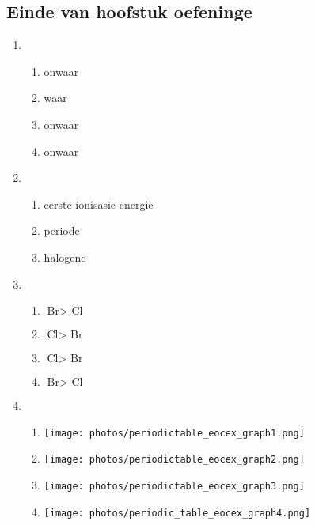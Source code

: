 \subsection{Einde van hoofstuk oefeninge} 
\begin{multicols}{3}
    \begin{enumerate}[itemsep=6pt, label=\textbf{\arabic*}. ] 
\item %
 \begin{enumerate}[noitemsep, label=\textbf{(\alph*)} ]
    \item onwaar
    \item waar
    \item onwaar
    \item onwaar
    \end{enumerate}
\item %
 \begin{enumerate}[noitemsep, label=\textbf{(\alph*)} ]
    \item eerste ionisasie-energie
    \item periode
    \item halogene
    \end{enumerate}
\item %
 \begin{enumerate}[noitemsep, label=\textbf{(\alph*)} ] 
    \item $\text{Br} > \text{ Cl}$
    \item $\text{Cl} > \text{ Br}$ 
    \item $\text{Cl} > \text{ Br}$
    \item $\text{Br} > \text{ Cl}$
    \end{enumerate}
\item %
 \begin{enumerate}[noitemsep, label=\textbf{(\alph*)} ]
    \item \texttt{[image: photos/periodictable\_eocex\_graph1.png]}
    \item \texttt{[image: photos/periodictable\_eocex\_graph2.png]}
    \item \texttt{[image: photos/periodictable\_eocex\_graph3.png]}
    \item \texttt{[image: photos/periodic\_table\_eocex\_graph4.png]}
    \end{enumerate}
\end{enumerate}
\end{multicols}

